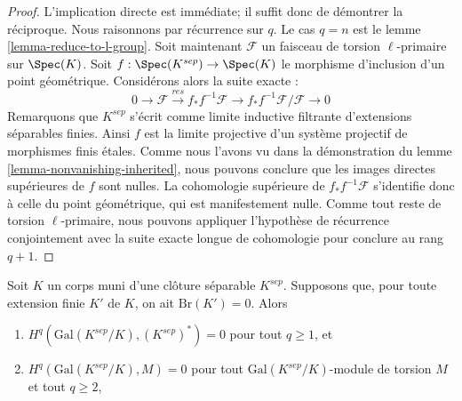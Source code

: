 \begin{proof}
L'implication directe est imm\'ediate; il suffit donc de d\'emontrer la r\'eciproque.
Nous raisonnons par r\'ecurrence sur $q$. Le cas $q = n$ est le
lemme \ref{lemma-reduce-to-l-group}. Soit maintenant
$\mathcal{F}$ un faisceau de torsion $\ell$-primaire sur $\Spec(K)$.
Soit $f : \Spec(K^{sep}) \rightarrow \Spec(K)$
le morphisme d'inclusion d'un point g\'eom\'etrique.
Consid\'erons alors la suite exacte :
$$
0 \rightarrow \mathcal{F} \xrightarrow{res}
f_* f^{-1} \mathcal{F} \rightarrow f_* f^{-1} \mathcal{F}/\mathcal{F} 
\rightarrow 0
$$
Remarquons que $K^{sep}$ s'\'ecrit comme limite inductive filtrante d'extensions
s\'eparables finies. Ainsi $f$
est la limite projective d'un syst\`eme projectif de morphismes finis \'etales.
Comme nous l'avons vu dans la d\'emonstration du
lemme \ref{lemma-nonvanishing-inherited}, nous pouvons conclure que les
images directes sup\'erieures de $f$ sont nulles. La cohomologie sup\'erieure de
$f_* f^{-1} \mathcal{F}$ s'identifie donc \`a celle du point g\'eom\'etrique, qui
est manifestement nulle. Comme tout reste de torsion $\ell$-primaire, nous pouvons appliquer
l'hypoth\`ese de r\'ecurrence conjointement avec la suite exacte longue de cohomologie
pour conclure au rang $q + 1$.
\end{proof}

\begin{proposition}
\label{proposition-serre-galois}
\begin{reference}
\cite[Chapter II, Section 3, Proposition 5]{SerreGaloisCohomology}
\end{reference}
Soit $K$ un corps muni d'une clôture séparable $K^{sep}$.
Supposons que, pour toute extension finie $K'$ de $K$, on ait
$\text{Br}(K') = 0$. Alors
\begin{enumerate}
\item $H^q(\text{Gal}(K^{sep}/K), (K^{sep})^*) = 0$
pour tout $q \geq 1$, et
\item $H^q(\text{Gal}(K^{sep}/K), M) = 0$
pour tout $\text{Gal}(K^{sep}/K)$-module de torsion $M$ et tout $q \geq 2$,
\end{enumerate}
\end{proposition}


